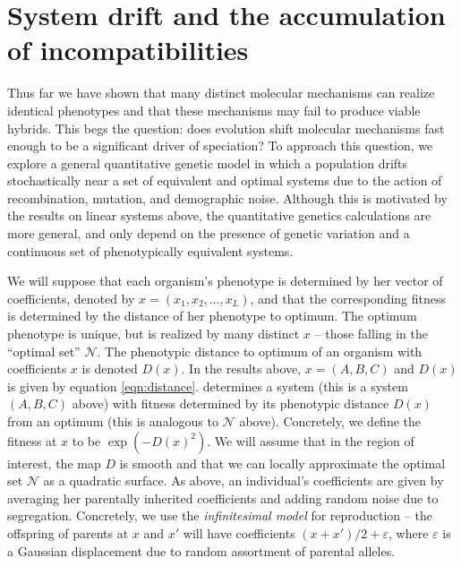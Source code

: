 \documentclass{article}
\newcommand{\1}{\mathbbm{1}}
\newcommand{\allS}{\mathcal{N}}
\begin{document}
\section*{System drift and the accumulation of incompatibilities}

Thus far we have shown that many distinct molecular mechanisms can realize identical phenotypes
and that these mechanisms may fail to produce viable hybrids.
This begs the question: does evolution shift molecular mechanisms
fast enough to be a significant driver of speciation?
To approach this question,
we explore a general quantitative genetic model in which a population drifts stochastically
near a set of equivalent and optimal systems
due to the action of recombination, mutation, and demographic noise.
Although this is motivated by the results on linear systems above,
the quantitative genetics calculations are more general,
and only depend on the presence of genetic variation and a continuous set of phenotypically equivalent systems.

We will suppose that each organism's phenotype is determined by her vector of coefficients, denoted by $x=(x_1, x_2, \ldots, x_L)$,
and that the corresponding fitness is determined by the distance of her phenotype to optimum.
The optimum phenotype is unique, but is realized by many distinct $x$ -- those falling in the ``optimal set'' $\allS$.
The phenotypic distance to optimum of an organism with coefficients $x$ is denoted $D(x)$.
In the results above, $x = (A,B,C)$ and $D(x)$ is given by equation \eqref{eqn:distance}.
determines a system (this is a system $(A,B,C)$ above) 
with fitness determined by its phenotypic distance $D(x)$ from an optimum (this is analogous to $\allS$ above). 
Concretely, we define the fitness at $x$ to be $\exp(-D(x)^2)$.
We will assume that in the region of interest, the map $D$ is smooth
and that we can locally approximate the optimal set $\allS$ as a quadratic surface.
As above, an individual's coefficients are given by averaging her parentally inherited coefficients and adding random noise due to segregation. 
Concretely, we use the \emph{infinitesimal model} for reproduction \citep{barton_infinitesimal} --
the offspring of parents at $x$ and $x'$ will have coefficients $(x+x')/2 + \varepsilon$,
where $\varepsilon$ is a Gaussian displacement due to random assortment of parental alleles.
\end{document}
